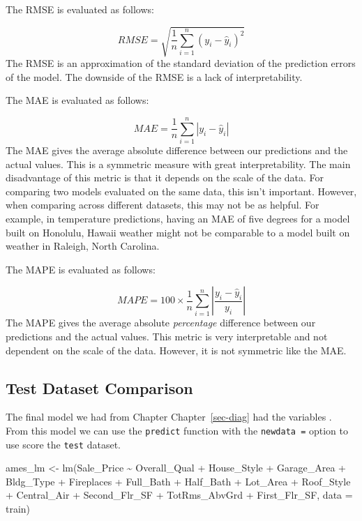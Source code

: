 \documentclass[
  letterpaper,
  DIV=11,
  numbers=noendperiod]{scrreprt}
\newenvironment{Shaded}{\begin{snugshade}}{\end{snugshade}}
\newcommand{\AttributeTok}[1]{\textcolor[rgb]{0.40,0.45,0.13}{#1}}
\newcommand{\FunctionTok}[1]{\textcolor[rgb]{0.28,0.35,0.67}{#1}}
\newcommand{\NormalTok}[1]{\textcolor[rgb]{0.00,0.23,0.31}{#1}}
\newcommand{\OtherTok}[1]{\textcolor[rgb]{0.00,0.23,0.31}{#1}}
\newcommand{\SpecialCharTok}[1]{\textcolor[rgb]{0.37,0.37,0.37}{#1}}
\begin{document}
The RMSE is evaluated as follows:

\[
RMSE = \sqrt {\frac{1}{n} \sum_{i=1}^n (y_i - \hat{y}_i)^2}
\] The RMSE is an approximation of the standard deviation of the
prediction errors of the model. The downside of the RMSE is a lack of
interpretability.

The MAE is evaluated as follows:

\[
MAE = \frac{1}{n} \sum_{i=1}^n |y_i - \hat{y}_i|
\] The MAE gives the average absolute difference between our predictions
and the actual values. This is a symmetric measure with great
interpretability. The main disadvantage of this metric is that it
depends on the scale of the data. For comparing two models evaluated on
the same data, this isn't important. However, when comparing across
different datasets, this may not be as helpful. For example, in
temperature predictions, having an MAE of five degrees for a model built
on Honolulu, Hawaii weather might not be comparable to a model built on
weather in Raleigh, North Carolina.

The MAPE is evaluated as follows:

\[
MAPE = 100 \times \frac{1}{n} \sum_{i=1}^n |\frac{y_i - \hat{y}_i}{y_i}|
\] The MAPE gives the average absolute \emph{percentage} difference
between our predictions and the actual values. This metric is very
interpretable and not dependent on the scale of the data. However, it is
not symmetric like the MAE.

\hypertarget{test-dataset-comparison}{%
\subsection{Test Dataset Comparison}\label{test-dataset-comparison}}

The final model we had from Chapter Chapter~\ref{sec-diag} had the
variables . From this model we can use the \texttt{predict} function
with the \texttt{newdata\ =} option to use score the \texttt{test}
dataset.

\begin{Shaded}
\begin{Highlighting}[]
\NormalTok{ames\_lm }\OtherTok{\textless{}{-}} \FunctionTok{lm}\NormalTok{(Sale\_Price }\SpecialCharTok{\textasciitilde{}}\NormalTok{ Overall\_Qual }\SpecialCharTok{+}\NormalTok{ House\_Style }\SpecialCharTok{+}\NormalTok{ Garage\_Area }\SpecialCharTok{+}\NormalTok{ Bldg\_Type }\SpecialCharTok{+} 
\NormalTok{    Fireplaces }\SpecialCharTok{+}\NormalTok{ Full\_Bath }\SpecialCharTok{+}\NormalTok{ Half\_Bath }\SpecialCharTok{+}\NormalTok{ Lot\_Area }\SpecialCharTok{+}\NormalTok{ Roof\_Style }\SpecialCharTok{+} 
\NormalTok{    Central\_Air }\SpecialCharTok{+}\NormalTok{ Second\_Flr\_SF }\SpecialCharTok{+}\NormalTok{ TotRms\_AbvGrd }\SpecialCharTok{+}\NormalTok{ First\_Flr\_SF, }\AttributeTok{data =}\NormalTok{ train)}
\end{Highlighting}
\end{Shaded}
\end{document}
